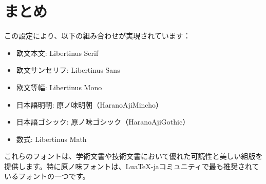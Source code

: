 \documentclass[a4paper,12pt]{ltjsarticle}
\begin{document}
\section{まとめ}

この設定により、以下の組み合わせが実現されています：

\begin{itemize}
    \item 欧文本文: Libertinus Serif
    \item 欧文サンセリフ: Libertinus Sans
    \item 欧文等幅: Libertinus Mono
    \item 日本語明朝: 原ノ味明朝（HaranoAjiMincho）
    \item 日本語ゴシック: 原ノ味ゴシック（HaranoAjiGothic）
    \item 数式: Libertinus Math
\end{itemize}

これらのフォントは、学術文書や技術文書において優れた可読性と美しい組版を提供します。特に原ノ味フォントは、Lua\TeX{}-jaコミュニティで最も推奨されているフォントの一つです。
\end{document}
